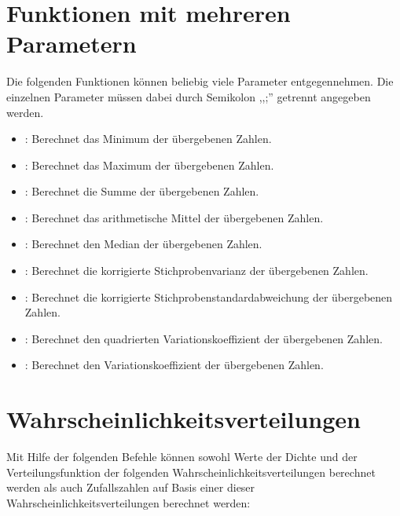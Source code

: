 \chapter{Funktionen mit mehreren Parametern}

Die folgenden Funktionen können beliebig viele Parameter entgegennehmen.
Die einzelnen Parameter müssen dabei durch Semikolon ,,;'' getrennt
angegeben werden.

\begin{itemize}

\item
{}:
Berechnet das Minimum der übergebenen Zahlen.

\item
{}:
Berechnet das Maximum der übergebenen Zahlen.

\item
{}:
Berechnet die Summe der übergebenen Zahlen.

\item
{}:
Berechnet das arithmetische Mittel der übergebenen Zahlen.

\item
{}:
Berechnet den Median der übergebenen Zahlen.

\item
{}:
Berechnet die korrigierte Stichprobenvarianz der übergebenen Zahlen.

\item
{}:
Berechnet die korrigierte Stichprobenstandardabweichung der übergebenen Zahlen.

\item
{}:
Berechnet den quadrierten Variationskoeffizient der übergebenen Zahlen.

\item
{}:
Berechnet den Variationskoeffizient der übergebenen Zahlen.

\end{itemize}



\chapter{Wahrscheinlichkeitsverteilungen}\label{sec:Wahrscheinlichkeitsverteilungen}

Mit Hilfe der folgenden Befehle können sowohl Werte der Dichte und der Verteilungsfunktion
der folgenden Wahrscheinlichkeitsverteilungen berechnet werden als auch Zufallszahlen
auf Basis einer dieser Wahrscheinlichkeitsverteilungen berechnet werden:



